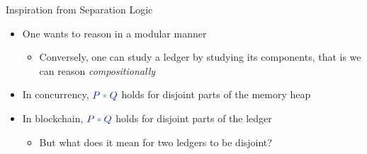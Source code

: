 \documentclass[aspectratio=43]{beamer}
\newcommand*{\mathcolor}{}
\def\mathcolor#1#{\mathcoloraux{#1}}
\newcommand*{\mathcoloraux}[3]{%
  \protect\leavevmode
  \begingroup
    \color#1{#2}#3%
  \endgroup
}
\newcommand{\HSSym}[1]{\mathcolor{hsblue4}{\ensuremath{#1}}}
\newcommand{\HSCon}[1]{\mathcolor{hsblue3}{#1}}
\begin{document}
\begin{frame}{Inspiration from Separation Logic}
\begin{itemize}
\item One wants to reason in a modular manner
  \begin{itemize}
  \item Conversely, one can study a ledger by studying its components, that is we can reason \textit{compositionally}
  \end{itemize}
\item In concurrency, \ensuremath{\HSCon{P}\HSSym{\ast}\HSCon{Q}} holds for disjoint parts of the memory heap
\item In blockchain, \ensuremath{\HSCon{P}\HSSym{\ast}\HSCon{Q}} holds for disjoint parts of the ledger
  \begin{itemize}
  \item But what does it mean for two ledgers to be disjoint?
  \end{itemize}
\end{itemize}
\end{frame}
\end{document}
